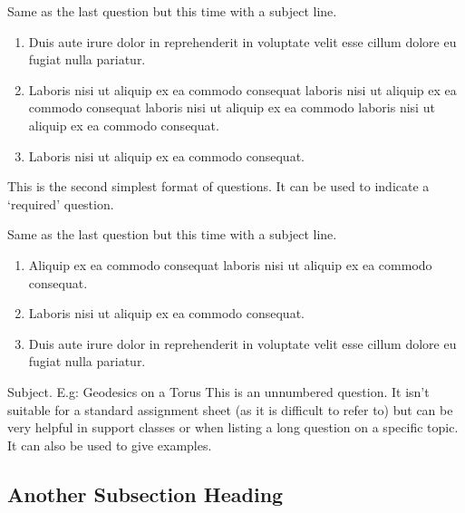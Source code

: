 \documentclass[11pt]{noether}
\begin{document}
\begin{nquest}
  Same as the last question but this time with a subject line.
  \begin{enumerate}
    \item Duis aute irure dolor in reprehenderit in voluptate velit esse cillum dolore eu fugiat nulla pariatur.
    \item Laboris nisi ut aliquip ex ea commodo consequat laboris nisi ut aliquip ex ea commodo consequat laboris nisi ut aliquip ex ea commodo laboris nisi ut aliquip ex ea commodo consequat.
    \item Laboris nisi ut aliquip ex ea commodo consequat.
  \end{enumerate}
\end{nquest}

\begin{nquest*}
  This is the second simplest format of questions. It can be used to indicate a `required' question.
\end{nquest*}

\begin{nquest*}
  Same as the last question but this time with a subject line.
  \begin{enumerate}
    \item Aliquip ex ea commodo consequat laboris nisi ut aliquip ex ea commodo consequat.
    \item Laboris nisi ut aliquip ex ea commodo consequat.
    \item Duis aute irure dolor in reprehenderit in voluptate velit esse cillum dolore eu fugiat nulla pariatur.
  \end{enumerate}
\end{nquest*}

\begin{quest}{Subject. E.g: Geodesics on a Torus}
  This is an unnumbered question. It isn't suitable for a standard assignment sheet (as it is difficult to refer to) but can be very helpful in support classes or when listing a long question on a specific topic. It can also be used to give examples.
\end{quest}

\subsection{Another Subsection Heading}
\end{document}
